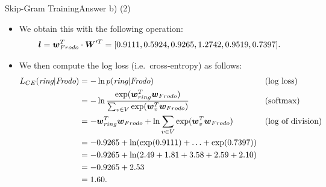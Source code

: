 \documentclass[t]{beamer}
\begin{document}
\begin{frame}{Skip-Gram Training}{Answer b) (2)}
    \begin{itemize}
        \item We obtain this with the following operation:
              \begin{align*}
                  {\boldsymbol{l}} = {\boldsymbol{w}}_{Frodo}^T\cdot {\boldsymbol{W}}'^T & = [0.9111, 0.5924, 0.9265, 1.2742, 0.9519, 0.7397].
              \end{align*}
        \item We then compute the log loss (i.e.\ cross-entropy) as follows:
              \begin{align*}
                  L_{CE}(\textit{ring}|\textit{Frodo}) & = - \ln p(\textit{ring}|\textit{Frodo})                                                           &  & \text{(log loss)}        \\
                                                       & = - \ln \frac{\text{exp}({\boldsymbol{w}}_{ring}^T{\boldsymbol{w}}_{Frodo})}{\sum_{v\in V}\text{exp}({\boldsymbol{w}}_{v}^T{\boldsymbol{w}}_{Frodo})} &  & \text{(softmax)}         \\
                                                       & = - {\boldsymbol{w}}_{ring}^T{\boldsymbol{w}}_{Frodo} + \ln \sum_{v\in V} \text{exp}({\boldsymbol{w}}_{v}^T{\boldsymbol{w}}_{Frodo})                  &  & \text{(log of division)} \\
                                                       & = - 0.9265 + \ln(\text{exp}(0.9111) + \ldots + \text{exp}(0.7397))                                                              \\
                                                       & = - 0.9265 + \ln(2.49 + 1.81 + 3.58 + 2.59 + 2.10)                                                                              \\
                                                       & = - 0.9265 + 2.53                                                                                                               \\
                                                       & = 1.60.
              \end{align*}
    \end{itemize}
\end{frame}
\end{document}
